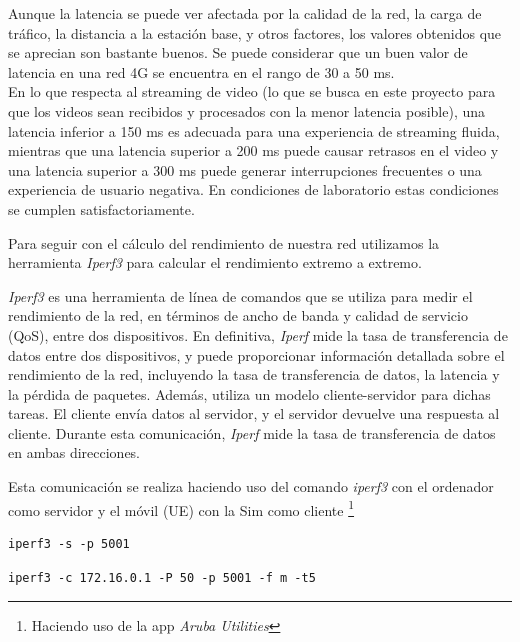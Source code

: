 Aunque la latencia se puede ver afectada por la calidad de la red, la carga de tráfico, la distancia a la estación base, y otros factores, los valores obtenidos que se aprecian son bastante buenos. Se puede considerar que un buen valor de latencia en una red 4G se encuentra en el rango de 30 a 50 ms.\\
En lo que respecta al streaming de video (lo que se busca en este proyecto para que los videos sean recibidos y procesados con la menor latencia posible), una latencia inferior a 150 ms es adecuada para una experiencia de streaming fluida, mientras que una latencia superior a 200 ms puede causar retrasos en el video y una latencia superior a 300 ms puede generar interrupciones frecuentes o una experiencia de usuario negativa. En condiciones de laboratorio estas condiciones se cumplen satisfactoriamente. 

Para seguir con el cálculo del rendimiento de nuestra red utilizamos la herramienta \textit{Iperf3} para calcular el rendimiento extremo a extremo.  

\textit{Iperf3} es una herramienta de línea de comandos que se utiliza para medir el rendimiento de la red, en términos de ancho de banda y calidad de servicio (QoS), entre dos dispositivos. En definitiva, \textit{Iperf} mide la tasa de transferencia de datos entre dos dispositivos, y puede proporcionar información detallada sobre el rendimiento de la red, incluyendo la tasa de transferencia de datos, la latencia y la pérdida de paquetes. Además, utiliza un modelo cliente-servidor para dichas tareas.
El cliente envía datos al servidor, y el servidor devuelve una respuesta al cliente. Durante esta comunicación, \textit{Iperf} mide la tasa de transferencia de datos en ambas direcciones.

Esta comunicación se realiza haciendo uso del comando \textit{iperf3} con el ordenador como servidor y el móvil (UE) con la Sim como cliente \footnote{Haciendo uso de la app \textit{Aruba Utilities}}

\begin{verbatim}
iperf3 -s -p 5001
\end{verbatim}

\begin{verbatim}
iperf3 -c 172.16.0.1 -P 50 -p 5001 -f m -t5
\end{verbatim}



